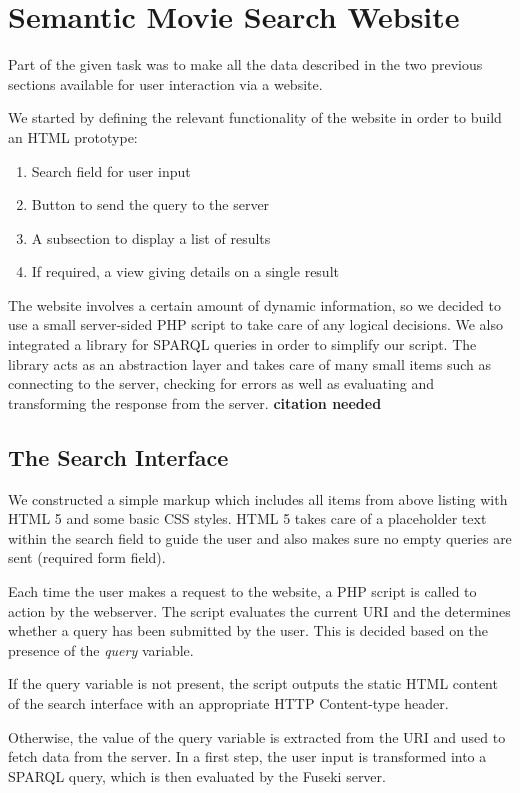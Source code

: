 \section{Semantic Movie Search Website}
Part of the given task was to make all the data described in the two previous sections available for user interaction via a website.

We started by defining the relevant functionality of the website in order to build an HTML prototype:

\begin{enumerate}
\item Search field for user input
\item Button to send the query to the server
\item A subsection to display a list of results
\item If required, a view giving details on a single result
\end{enumerate}

The website involves a certain amount of dynamic information, so we decided to use a small server-sided PHP script to take care of any logical decisions. We also integrated a library for SPARQL queries in order to simplify our script. The library acts as an abstraction layer and takes care of many small items such as connecting to the server, checking for errors as well as evaluating and transforming the response from the server. \textbf{citation needed}

\subsection{The Search Interface}
We constructed a simple markup which includes all items from above listing with HTML 5 and some basic CSS styles. HTML 5 takes care of a placeholder text within the search field to guide the user and also makes sure no empty queries are sent (required form field).

Each time the user makes a request to the website, a PHP script is called to action by the webserver. The script evaluates the current URI and the determines whether a query has been submitted by the user. This is decided based on the presence of the \emph{query} variable.

If the query variable is not present, the script outputs the static HTML content of the search interface with an appropriate HTTP Content-type header.

Otherwise, the value of the query variable is extracted from the URI and used to fetch data from the server. In a first step, the user input is transformed into a SPARQL query, which is then evaluated by the Fuseki server.

